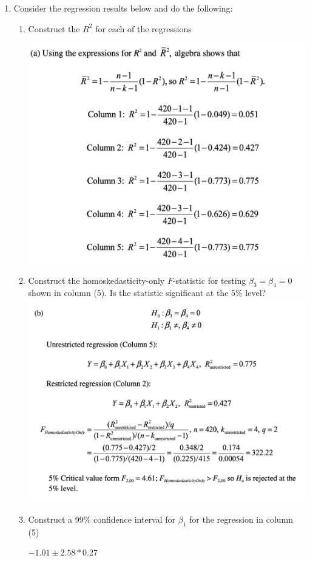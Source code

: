 \documentclass[
]{article}
\providecommand{\tightlist}{%
  \setlength{\itemsep}{0pt}\setlength{\parskip}{0pt}}
\begin{document}
\begin{enumerate}
\def\labelenumi{\arabic{enumi}.}
\setcounter{enumi}{4}
\tightlist
\item
  Consider the regression results below and do the following:

  \begin{enumerate}
  \def\labelenumii{\alph{enumii}.}
  \tightlist
  \item
    Construct the \(R^2\) for each of the regressions
    
        \includegraphics[scale=0.3]{solutions/ps4-q5a.png}

    
  \item
    Construct the homoskedasticity-only \(F\)-statistic for testing
    \(\beta_3 = \beta_4 = 0\) shown in column (5). Is the statistic
    significant at the 5\% level?
    \includegraphics[scale=0.3]{solutions/ps4-q5b.png}
  \item
    Construct a 99\% confidence interval for \(\beta_1\) for the
    regression in column (5)
    
    {\color{red} 
    $-1.01 \pm 2.58*0.27$ 
    } 
    
  \end{enumerate}
\end{enumerate}
\end{document}
